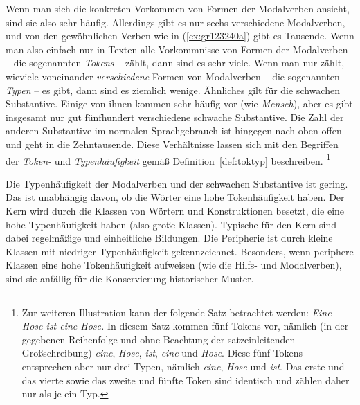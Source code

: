 Wenn man sich die konkreten Vorkommen von Formen der Modalverben ansieht, sind sie also sehr häufig.
Allerdings gibt es nur sechs verschiedene Modalverben, und von den gewöhnlichen Verben wie in (\ref{ex:gr123240a}) gibt es Tausende.
Wenn man also einfach nur in Texten alle Vorkommnisse von Formen der Modalverben -- die sogenannten \textit{Tokens} -- zählt, dann sind es sehr viele.
Wenn man nur zählt, wieviele voneinander \textit{verschiedene} Formen von Modalverben -- die sogenannten \textit{Typen} -- es gibt, dann sind es ziemlich wenige.
Ähnliches gilt für die schwachen Substantive.
Einige von ihnen kommen sehr häufig vor (wie \textit{Mensch}), aber es gibt insgesamt nur gut fünfhundert verschiedene schwache Substantive.
Die Zahl der anderen Substantive im normalen Sprachgebrauch ist hingegen nach oben offen und geht in die Zehntausende.
Diese Verhältnisse lassen sich mit den Begriffen der \textit{Token-} und \textit{Typenhäufigkeit} gemäß Definition~\ref{def:toktyp} beschreiben.%
\footnote{Zur weiteren Illustration kann der folgende Satz betrachtet werden:
\textit{Eine Hose ist eine Hose.}
In diesem Satz kommen fünf Tokens vor, nämlich (in der gegebenen Reihenfolge und ohne Beachtung der satzeinleitenden Großschreibung) \textit{eine}, \textit{Hose}, \textit{ist}, \textit{eine} und \textit{Hose}.
Diese fünf Tokens entsprechen aber nur drei Typen, nämlich \textit{eine}, \textit{Hose} und \textit{ist}.
Das erste und das vierte sowie das zweite und fünfte Token sind identisch und zählen daher nur als je ein Typ.
}


Die Typenhäufigkeit der Modalverben und der schwachen Substantive ist gering.
Das ist unabhängig davon, ob die Wörter eine hohe Tokenhäufigkeit haben.
Der Kern wird durch die Klassen von Wörtern und Konstruktionen besetzt, die eine hohe Typenhäufigkeit haben (also große Klassen).
Typische für den Kern sind dabei regelmäßige und einheitliche Bildungen.
Die Peripherie ist durch kleine Klassen mit niedriger Typenhäufigkeit gekennzeichnet.
Besonders, wenn periphere Klassen eine hohe Tokenhäufigkeit aufweisen (wie die Hilfs- und Modalverben), sind sie anfällig für die Konservierung historischer Muster.


